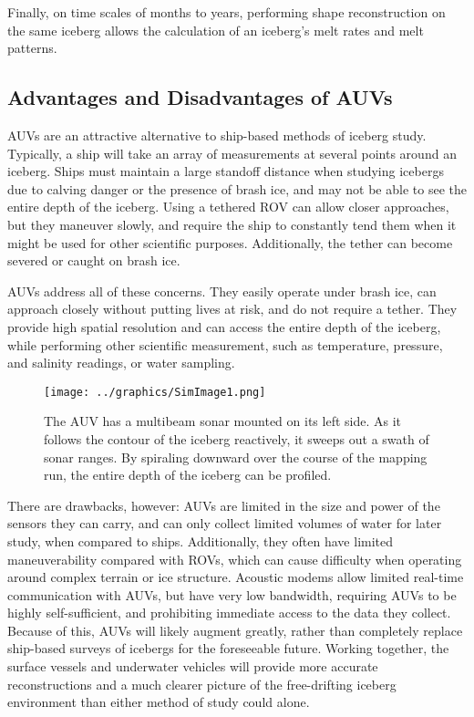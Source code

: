 Finally, on time scales of months to years, performing shape reconstruction on the same iceberg allows the calculation of an iceberg's melt rates and melt patterns.

\subsection{Advantages and Disadvantages of AUVs}

AUVs are an attractive alternative to ship-based methods of iceberg study. Typically, a ship will take an array of measurements at several points around an iceberg. Ships must maintain a large standoff distance when studying icebergs due to calving danger or the presence of brash ice, and may not be able to see the entire depth of the iceberg. Using a tethered ROV can allow closer approaches, but they maneuver slowly, and require the ship to constantly tend them when it might be used for other scientific purposes. Additionally, the tether can become severed or caught on brash ice.

AUVs address all of these concerns. They easily operate under brash ice, can approach closely without putting lives at risk, and do not require a tether. They provide high spatial resolution and can access the entire depth of the iceberg, while performing other scientific measurement, such as temperature, pressure, and salinity readings, or water sampling. 


\begin{figure}[htbp]
   \centering
   \texttt{[image: ../graphics/SimImage1.png]} %
   \caption{The AUV has a multibeam sonar mounted on its left side. As it follows the contour of the iceberg reactively, it sweeps out a swath of sonar ranges. By spiraling downward over the course of the mapping run, the entire depth of the iceberg can be profiled.}
   \label{fig:simImage1}
\end{figure}


There are drawbacks, however: AUVs are limited in the size and power of the sensors they can carry, and can only collect limited volumes of water for later study, when compared to ships. Additionally, they often have limited maneuverability compared with ROVs, which can cause difficulty when operating around complex terrain or ice structure. Acoustic modems allow limited real-time communication with AUVs, but have very low bandwidth, requiring AUVs to be highly self-sufficient, and prohibiting immediate access to the data they collect. Because of this, AUVs will likely augment greatly, rather than completely replace ship-based surveys of icebergs for the foreseeable future. Working together, the surface vessels and underwater vehicles will provide more accurate reconstructions and a much clearer picture of the free-drifting iceberg environment than either method of study could alone.

